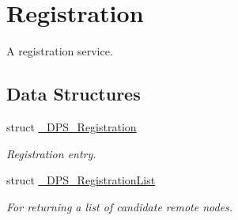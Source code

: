 \hypertarget{group__registration}{}\section{Registration}
\label{group__registration}


A registration service.  


\subsection*{Data Structures}
\begin{DoxyCompactItemize}
\item 
struct \hyperlink{struct___d_p_s___registration}{\+\_\+\+D\+P\+S\+\_\+\+Registration}
\begin{DoxyCompactList}\small\item\em Registration entry. \end{DoxyCompactList}\item 
struct \hyperlink{struct___d_p_s___registration_list}{\+\_\+\+D\+P\+S\+\_\+\+Registration\+List}
\begin{DoxyCompactList}\small\item\em For returning a list of candidate remote nodes. \end{DoxyCompactList}\end{DoxyCompactItemize}
